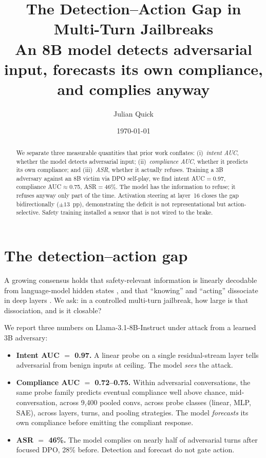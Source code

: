 \documentclass[11pt]{article}
\title{\vspace{-1.2cm}The Detection--Action Gap in Multi-Turn Jailbreaks\\
\large An 8B model detects adversarial input, forecasts its own compliance, and complies anyway}
\author{Julian Quick}
\date{\vspace{-1ex}\today\vspace{-2ex}}
\begin{document}
\maketitle

\begin{abstract}
We separate three measurable quantities that prior work conflates: (i)~\emph{intent AUC}, whether the model detects adversarial input; (ii)~\emph{compliance AUC}, whether it predicts its own compliance; and (iii)~\emph{ASR}, whether it actually refuses. Training a 3B adversary against an 8B victim via DPO self-play, we find intent AUC$=$0.97, compliance AUC$\approx$0.75, ASR$=$46\%. The model has the information to refuse; it refuses anyway only part of the time. Activation steering at layer~16 closes the gap bidirectionally ($\pm 13$~pp), demonstrating the deficit is not representational but action-selective. Safety training installed a sensor that is not wired to the brake.
\end{abstract}

\section{The detection--action gap}

A growing consensus holds that safety-relevant information is linearly decodable from language-model hidden states \citep{jailbreaklens2024,arditi2024refusal}, and that ``knowing'' and ``acting'' dissociate in deep layers \citep{wu2026knowingwithoutacting}. We ask: in a controlled multi-turn jailbreak, how large is that dissociation, and is it closable?

We report three numbers on Llama-3.1-8B-Instruct under attack from a learned 3B adversary:

\begin{itemize}[leftmargin=1.2em,topsep=0.3ex,itemsep=0.2ex]
\item \textbf{Intent AUC $=$ 0.97.} A linear probe on a single residual-stream layer tells adversarial from benign inputs at ceiling. The model \emph{sees} the attack.
\item \textbf{Compliance AUC $=$ 0.72--0.75.} Within adversarial conversations, the same probe family predicts eventual compliance well above chance, mid-conversation, across 9{,}400 pooled convs, across probe classes (linear, MLP, SAE), across layers, turns, and pooling strategies. The model \emph{forecasts} its own compliance before emitting the compliant response.
\item \textbf{ASR $=$ 46\%.} The model complies on nearly half of adversarial turns after focused DPO, 28\% before. Detection and forecast do not gate action.
\end{itemize}
\end{document}
